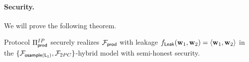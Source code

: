 

\paragraph{Security.}
We will prove the following theorem.
\begin{theorem}\label{th:prodIP}
Protocol $\Pi_{\mathsf{prod}}^{IP}$ securely realizes $\mathcal{F}_{\mathsf{prod}}$ with leakage $f_{\mathsf{Leak}}(\mathbf{w}_1,
\mathbf{w}_2) = \langle \mathbf{w}_1, \mathbf{w}_2 \rangle$ in the $\{\mathcal{F}_{\mathsf{osample(L_1)}}, \mathcal{F}_{2PC}
\}$-hybrid model with semi-honest security.
\end{theorem}

